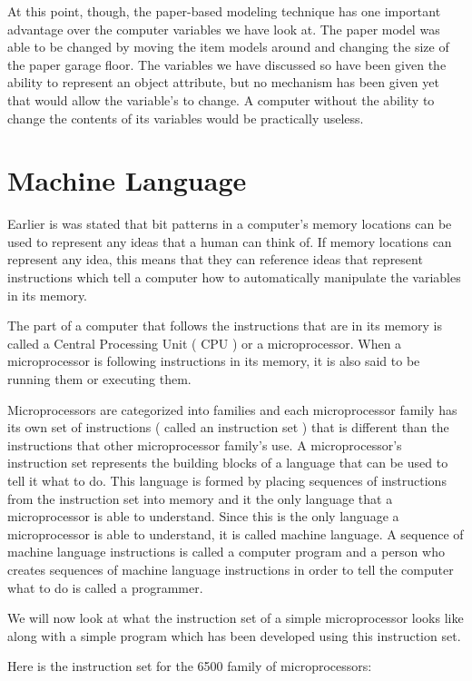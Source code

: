 \documentclass[12pt,oneside]{book}
\begin{document}
At this point, though, the paper{}-based modeling technique has one important advantage over the computer variables we have look at. The paper model was able to be changed by moving the item models around and changing the size of the paper garage floor. The variables we have discussed so have been given the ability to represent an object attribute, but no mechanism has been given yet that would allow the variable's to change. A computer without the ability to change the contents of its variables would be practically useless.

\section[Machine Language]{Machine Language}

Earlier is was stated that bit patterns in a computer's memory locations can be used to represent any ideas that a human can think of. If memory locations can represent any idea, this means that they can reference ideas that represent instructions which tell a computer how to automatically manipulate the variables in its memory. 

The part of a computer that follows the instructions that are in its memory is called a Central Processing Unit ( CPU ) or a microprocessor. When a microprocessor is following instructions in its memory, it is also said to be running them or executing them. 

Microprocessors are categorized into families and each microprocessor family has its own set of instructions ( called an instruction set ) that is different than the instructions that other microprocessor family's use. A microprocessor's instruction set represents the building blocks of a language that can be used to tell it what to do. This language is formed by placing sequences of instructions from the instruction set into memory and it the only language that a microprocessor is able to understand. Since this is the only language a microprocessor is able to understand, it is called machine language. A sequence of machine language instructions is called a computer program and a person who creates sequences of machine language instructions in order to tell the computer what to do is called a programmer. 

We will now look at what the instruction set of a simple microprocessor looks like along with a simple program which has been developed using this instruction set. 

Here is the instruction set for the 6500 family of microprocessors:
\end{document}
